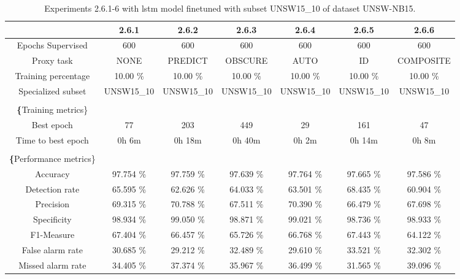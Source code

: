 \begin{table}[htb]
    \centering
    \begin{tabular}{@{}ccccccc@{}}
        \toprule
         & 2.6.1 & 2.6.2 & 2.6.3 & 2.6.4 & 2.6.5 & 2.6.6 \\
        \midrule
        Epochs Supervised &  600 &  600 &  600 &  600 &  600 &  600 \\
        Proxy task &  NONE &  PREDICT &  OBSCURE &  AUTO &  ID &  COMPOSITE \\
        Training percentage &  10.00 \% &  10.00 \% &  10.00 \% &  10.00 \% &  10.00 \% &  10.00 \% \\
        Specialized subset &  UNSW15\_10 &  UNSW15\_10 &  UNSW15\_10 &  UNSW15\_10 &  UNSW15\_10 &  UNSW15\_10 \\
         \\
        \textbf\{Training metrics\} &  &  &  &  &  &  \\
        Best epoch &  77 &  203 &  449 &  29 &  161 &  47 \\
        Time to best epoch &  0h 6m &  0h 18m &  0h 40m &  0h 2m &  0h 14m &  0h 8m \\
         \\
        \textbf\{Performance metrics\} &  &  &  &  &  &  \\
        Accuracy &  97.754 \% &  97.759 \% &  97.639 \% &  97.764 \% &  97.665 \% &  97.586 \% \\
        Detection rate &  65.595 \% &  62.626 \% &  64.033 \% &  63.501 \% &  68.435 \% &  60.904 \% \\
        Precision &  69.315 \% &  70.788 \% &  67.511 \% &  70.390 \% &  66.479 \% &  67.698 \% \\
        Specificity &  98.934 \% &  99.050 \% &  98.871 \% &  99.021 \% &  98.736 \% &  98.933 \% \\
        F1-Measure &  67.404 \% &  66.457 \% &  65.726 \% &  66.768 \% &  67.443 \% &  64.122 \% \\
        False alarm rate &  30.685 \% &  29.212 \% &  32.489 \% &  29.610 \% &  33.521 \% &  32.302 \% \\
        Missed alarm rate &  34.405 \% &  37.374 \% &  35.967 \% &  36.499 \% &  31.565 \% &  39.096 \% \\
        \bottomrule
    \end{tabular}
    \caption{Experiments 2.6.1-6 with \gls{lstm} model finetuned with subset UNSW15\_10 of dataset UNSW-NB15.}
    \label{table:results:lstm:stats_flows15_subset}
\end{table}